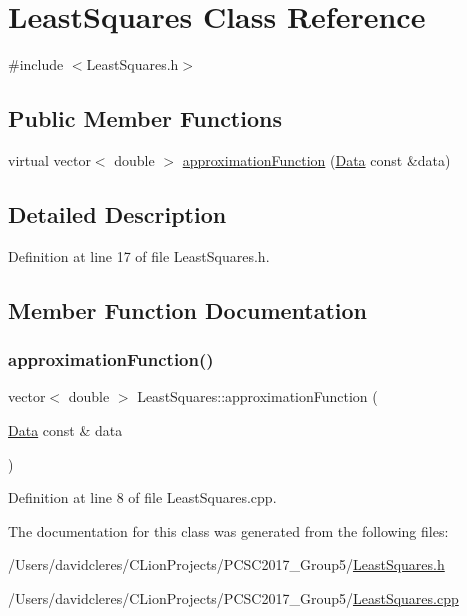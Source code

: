 \hypertarget{class_least_squares}{}\section{Least\+Squares Class Reference}
\label{class_least_squares}


{\ttfamily \#include $<$Least\+Squares.\+h$>$}

\subsection*{Public Member Functions}
\begin{DoxyCompactItemize}
\item 
virtual vector$<$ double $>$ \mbox{\hyperlink{class_least_squares_ab576ac54e5ca826ab4d41f7e9ed26bb4}{approximation\+Function}} (\mbox{\hyperlink{struct_data}{Data}} const \&data)
\end{DoxyCompactItemize}


\subsection{Detailed Description}


Definition at line 17 of file Least\+Squares.\+h.



\subsection{Member Function Documentation}
\mbox{\label{class_least_squares_ab576ac54e5ca826ab4d41f7e9ed26bb4}} 
\subsubsection{\texorpdfstring{approximation\+Function()}{approximationFunction()}}
{\footnotesize\ttfamily vector$<$ double $>$ Least\+Squares\+::approximation\+Function (\begin{DoxyParamCaption}\item[{\mbox{\hyperlink{struct_data}{Data}} const \&}]{data }\end{DoxyParamCaption})\hspace{0.3cm}{\ttfamily [virtual]}}



Definition at line 8 of file Least\+Squares.\+cpp.



The documentation for this class was generated from the following files\+:\begin{DoxyCompactItemize}
\item 
/\+Users/davidcleres/\+C\+Lion\+Projects/\+P\+C\+S\+C2017\+\_\+\+Group5/\mbox{\hyperlink{_least_squares_8h}{Least\+Squares.\+h}}\item 
/\+Users/davidcleres/\+C\+Lion\+Projects/\+P\+C\+S\+C2017\+\_\+\+Group5/\mbox{\hyperlink{_least_squares_8cpp}{Least\+Squares.\+cpp}}\end{DoxyCompactItemize}
